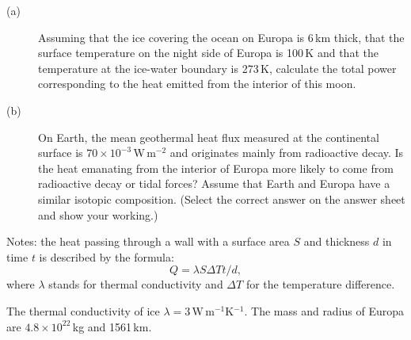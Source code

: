 \begin{description}
\item[(a)] Assuming that the ice covering the ocean on Europa is 6\,km thick,
  that the surface temperature on the night side of Europa is 100\,K and that
  the temperature at the ice-water boundary is 273\,K, calculate the total
  power corresponding to the heat emitted from the interior of this moon.
\item[(b)] On Earth, the mean geothermal heat flux measured at the
  continental surface is $70 \times 10^{-3}$\,W\,m$^{-2}$ and originates
  mainly from radioactive decay. Is the heat emanating from the interior of
  Europa more likely to come from radioactive decay or tidal forces? Assume
  that Earth and Europa have a similar isotopic composition. (Select the
  correct answer on the answer sheet and show your working.)
\end{description}

Notes: the heat passing through a wall with a surface area $S$ and thickness
$d$ in time $t$ is described by the formula:
\[ Q = \lambda S \Delta T t / d, \]
where $\lambda$ stands for thermal conductivity and $\Delta T$ for the
temperature difference.

The thermal conductivity of ice
$\lambda = 3$\,W\,m$^{-1}$K$^{-1}$. The mass and radius of Europa are
$4.8 \times 10^{22}$\,kg and 1561\,km.
